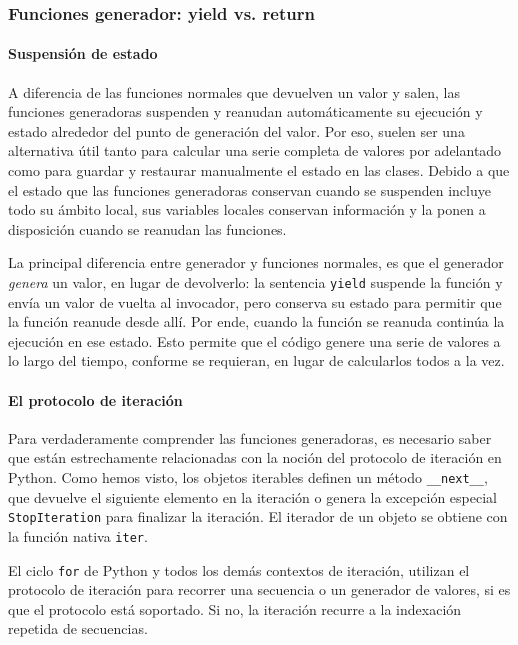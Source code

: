 \subsubsection{Funciones generador: yield vs. return}

\paragraph{Suspensión de estado}

A diferencia de las funciones normales que devuelven un valor y salen,
las funciones generadoras suspenden y reanudan automáticamente su
ejecución y estado alrededor del punto de generación del valor. Por eso,
suelen ser una alternativa útil tanto para calcular una serie completa
de valores por adelantado como para guardar y restaurar manualmente el
estado en las clases. Debido a que el estado que las funciones
generadoras conservan cuando se suspenden incluye todo su ámbito local,
sus variables locales conservan información y la ponen a disposición
cuando se reanudan las funciones.

La principal diferencia entre generador y funciones normales, es que el
generador \emph{genera} un valor, en lugar de devolverlo: la sentencia
\texttt{yield} suspende la función y envía un valor de vuelta al
invocador, pero conserva su estado para permitir que la función reanude
desde allí. Por ende, cuando la función se reanuda continúa la ejecución
en ese estado. Esto permite que el código genere una serie de valores a
lo largo del tiempo, conforme se requieran, en lugar de calcularlos
todos a la vez.

\paragraph{El protocolo de iteración}

Para verdaderamente comprender las funciones generadoras, es necesario
saber que están estrechamente relacionadas con la noción del protocolo
de iteración en Python. Como hemos visto, los objetos iterables definen
un método \texttt{\_\_next\_\_}, que devuelve el siguiente elemento en
la iteración o genera la excepción especial \texttt{StopIteration} para
finalizar la iteración. El iterador de un objeto se obtiene con la
función nativa \texttt{iter}.

El ciclo \texttt{for} de Python y todos los demás contextos de
iteración, utilizan el protocolo de iteración para recorrer una
secuencia o un generador de valores, si es que el protocolo está
soportado. Si no, la iteración recurre a la indexación repetida de
secuencias.

